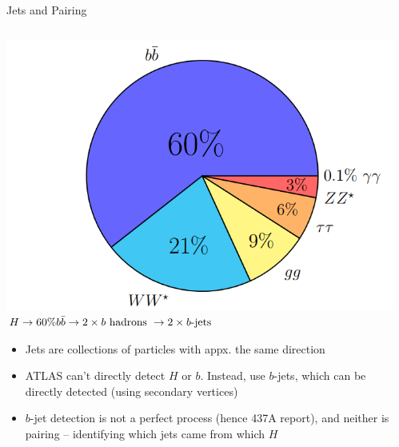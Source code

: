 \documentclass[10pt, aspectratio=169]{beamer}
\begin{document}
{
\begin{frame}{Jets and Pairing}
  \begin{columns}[onlytextwidth]
    \begin{column}{0.76\textwidth}
      \centering
      \includegraphics[width=0.35\linewidth]{images/branching_ratios.png}\\
      $H \to 60\%\space b\bar{b} \to 2 \times b \text{ hadrons } \to 2 \times b\text{-jets}$
      \begin{itemize}
        \item \alert{Jets} are collections of particles with appx. the same direction
        \item ATLAS can't directly detect $H$ or $b$. Instead, use \alert{$b$-jets}, which can be directly detected (using secondary vertices)
        \item $b$-jet detection is not a perfect process (hence 437A report), and neither is \alert{pairing} -- identifying which jets came from which $H$
      \end{itemize}
    \end{column}
    \begin{column}{0.25\textwidth}

\end{column}
\end{columns}
\end{frame}}
\end{document}
